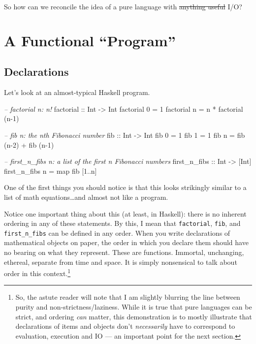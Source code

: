 \documentclass[]{article}
\newenvironment{Shaded}{}{}
\newcommand{\DataTypeTok}[1]{\textcolor[rgb]{0.56,0.13,0.00}{{#1}}}
\newcommand{\DecValTok}[1]{\textcolor[rgb]{0.25,0.63,0.44}{{#1}}}
\newcommand{\CommentTok}[1]{\textcolor[rgb]{0.38,0.63,0.69}{\textit{{#1}}}}
\newcommand{\OtherTok}[1]{\textcolor[rgb]{0.00,0.44,0.13}{{#1}}}
\newcommand{\FunctionTok}[1]{\textcolor[rgb]{0.02,0.16,0.49}{{#1}}}
\newcommand{\NormalTok}[1]{{#1}}
\begin{document}
So how can we reconcile the idea of a pure language with \sout{anything
useful} I/O?

\section{\texorpdfstring{A Functional
``Program''}{A Functional Program}}\label{a-functional-program}

\subsection{Declarations}\label{declarations}

Let's look at an almost-typical Haskell program.

\begin{Shaded}
\begin{Highlighting}[]
\CommentTok{--  factorial n: n!}
\OtherTok{factorial ::} \DataTypeTok{Int} \OtherTok{->} \DataTypeTok{Int}
\NormalTok{factorial }\DecValTok{0} \FunctionTok{=} \DecValTok{1}
\NormalTok{factorial n }\FunctionTok{=} \NormalTok{n }\FunctionTok{*} \NormalTok{factorial (n}\FunctionTok{-}\DecValTok{1}\NormalTok{)}

\CommentTok{--  fib n: the nth Fibonacci number}
\OtherTok{fib ::} \DataTypeTok{Int} \OtherTok{->} \DataTypeTok{Int}
\NormalTok{fib }\DecValTok{0} \FunctionTok{=} \DecValTok{1}
\NormalTok{fib }\DecValTok{1} \FunctionTok{=} \DecValTok{1}
\NormalTok{fib n }\FunctionTok{=} \NormalTok{fib (n}\FunctionTok{-}\DecValTok{2}\NormalTok{) }\FunctionTok{+} \NormalTok{fib (n}\FunctionTok{-}\DecValTok{1}\NormalTok{)}

\CommentTok{--  first_n_fibs n: a list of the first n Fibonacci numbers}
\OtherTok{first_n_fibs ::} \DataTypeTok{Int} \OtherTok{->} \NormalTok{[}\DataTypeTok{Int}\NormalTok{]}
\NormalTok{first_n_fibs n }\FunctionTok{=} \NormalTok{map fib [}\DecValTok{1}\FunctionTok{..}\NormalTok{n]}
\end{Highlighting}
\end{Shaded}

One of the first things you should notice is that this looks strikingly
similar to a list of math equations\ldots{}and almost not like a
program.

Notice one important thing about this (at least, in Haskell): there is
no inherent ordering in any of these statements. By this, I mean that
\texttt{factorial}, \texttt{fib}, and \texttt{first\_n\_fibs} can be
defined in any order. When you write declarations of mathematical
objects on paper, the order in which you declare them should have no
bearing on what they represent. These are functions. Immortal,
unchanging, ethereal, separate from time and space. It is simply
nonsensical to talk about order in this context.\footnote{So, the astute
  reader will note that I am slightly blurring the line between purity
  and non-strictness/laziness. While it is true that pure languages can
  be strict, and ordering \emph{can} matter, this demonstration is to
  mostly illustrate that declarations of items and objects don't
  \emph{necessarily} have to correspond to evaluation, execution and IO
  --- an important point for the next section.}
\end{document}
